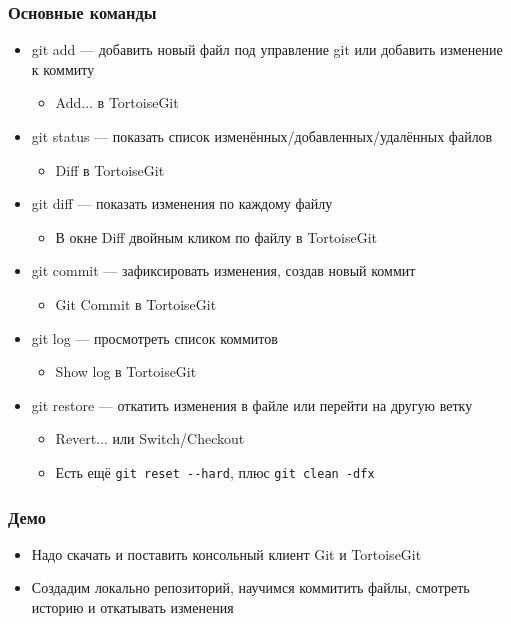 \documentclass{../../slides-style}
\begin{document}
    \begin{frame}[fragile]
        \frametitle{Основные команды}
        \begin{itemize}
            \item git add --- добавить новый файл под управление git или добавить изменение к коммиту
            \begin{itemize}
                \item Add... в TortoiseGit
            \end{itemize}
            \item git status --- показать список изменённых/добавленных/удалённых файлов
            \begin{itemize}
                \item Diff в TortoiseGit
            \end{itemize}
            \item git diff --- показать изменения по каждому файлу
            \begin{itemize}
                \item В окне Diff двойным кликом по файлу в TortoiseGit
            \end{itemize}
            \item git commit --- зафиксировать изменения, создав новый коммит
            \begin{itemize}
                \item Git Commit в TortoiseGit
            \end{itemize}
            \item git log --- просмотреть список коммитов
            \begin{itemize}
                \item Show log в TortoiseGit
            \end{itemize}
            \item git restore --- откатить изменения в файле или перейти на другую ветку
            \begin{itemize}
                \item Revert... или Switch/Checkout
                \item Есть ещё \verb|git reset --hard|, плюс \verb|git clean -dfx|
            \end{itemize}
        \end{itemize}
    \end{frame}

    \begin{frame}
        \frametitle{Демо}
        \begin{itemize}
            \item Надо скачать и поставить консольный клиент Git и TortoiseGit
            \item Создадим локально репозиторий, научимся коммитить файлы, смотреть историю и откатывать изменения
        \end{itemize}
    \end{frame}
\end{document}
